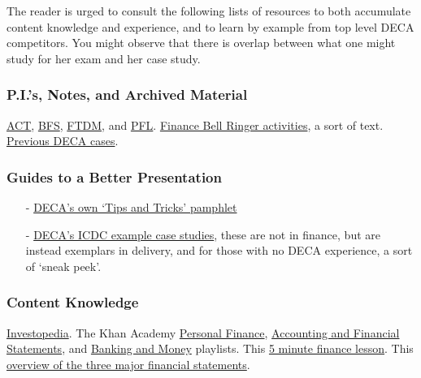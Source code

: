 \documentclass[12pt]{article}
\begin{document}
	The reader is urged to consult the following lists of resources to both accumulate content knowledge and experience, and to learn by example from top level DECA competitors. You might observe that there is overlap between what one might study for her exam and her case study.
	
\subsubsection*{P.I.'s, Notes, and Archived Material}
	
	  \href{http://www.deca.ca/documents/Performance\%20Indicators/ACT.docx}{ACT}, 
	  \href{http://www.deca.ca/documents/Performance\%20Indicators/BFS.docx}{BFS}, 
	  \href{http://www.deca.ca/documents/Performance\%20Indicators/FTDM.docx}{FTDM}, and 
	  \href{http://www.deca.ca/documents/Performance\%20Indicators/PFL.docx}{PFL}.  					\href{ilcollaborate.org/wp-content/uploads/2014/11/Finance-Indicators-Explained.docx}{Finance Bell Ringer activities}, a sort of text. \href{https://saltfleetdeca.commons.hwdsb.on.ca/sample-page/}{Previous DECA cases}.

\subsubsection*{Guides to a Better Presentation}
\begin{itemize}
	\item[-] \href{https://issuu.com/decainc/docs/deca_competitive_events_success}{DECA's own \lq Tips and Tricks' pamphlet}
	\item[-] \href{https://www.deca.org/high-school-programs/competitive-events-sample-videos-hs/}{DECA's ICDC example case studies}, these are not in finance, but are instead exemplars in delivery, and for those with no DECA experience, a sort of \lq sneak peek'.
\end{itemize}

\subsubsection*{Content Knowledge}
	\href{http://www.investopedia.com/}{Investopedia}. The Khan Academy \href{https://www.youtube.com/playlist?list=PL83DF21B47327EDFE}{Personal Finance},  \href{https://www.youtube.com/playlist?list=PLXuBZowfrFgYddDQpXdDtViretdX4ECKS}{Accounting and Financial Statements}, and \href{https://www.youtube.com/playlist?list=PLCECDA315A8848B99}{Banking and Money} playlists. This \href{https://www.youtube.com/watch?v=mhmaHayMha8}{5 minute finance lesson}. This \href{https://www.youtube.com/watch?v=B7300KsDdYY}{overview of the three major financial statements}. 
	
\end{document}
